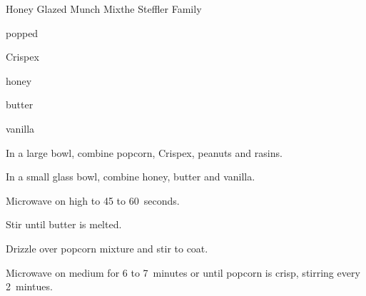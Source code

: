 \begin{recipe}{Honey Glazed Munch Mix}{the Steffler Family}{}

\begin{ingredients}
\item {} popped 
\item {} Crispex 
\item \C{\half} 
\item \C{\quarter} 
\item \C{\quarter} honey
\item \C{\quarter} butter
\item \tp{\quarter} vanilla
\end{ingredients}

\begin{directions}
\item In a large bowl, combine popcorn, Crispex, peanuts and rasins.
\item In a small glass bowl, combine honey, butter and vanilla.
\item Microwave on high to 45 to 60~seconds.
\item Stir until butter is melted.
\item Drizzle over popcorn mixture and stir to coat.
\item Microwave on medium for 6 to 7~minutes or until popcorn is crisp, stirring every 2~mintues.
\end{directions}
\end{recipe}
